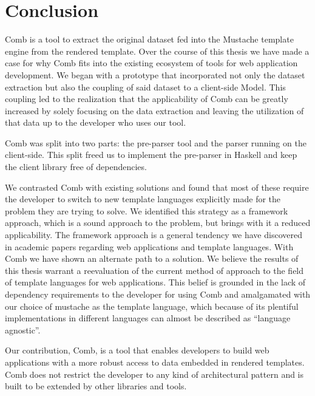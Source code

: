 \documentclass[thesis.tex]{subfiles}
\begin{document}
\chapter{Conclusion}
\label{chap:conclusion}
Comb is a tool to extract the original dataset fed into the Mustache template
engine from the rendered template.
Over the course of this thesis we have made a case for why Comb fits into the
existing ecosystem of tools for web application development.
We began with a prototype that incorporated not only the dataset extraction but
also the coupling of said dataset to a client-side Model.
This coupling led to the realization that the applicability of Comb can be
greatly increased by solely focusing on the data extraction and leaving the
utilization of that data up to the developer who uses our tool.

Comb was split into two parts: the pre-parser tool and the parser running on
the client-side. This split freed us to implement the pre-parser in Haskell
and keep the client library free of dependencies.


We contrasted Comb with existing solutions and found that most of these require
the developer to switch to new template languages explicitly made for the
problem they are trying to solve. We identified this strategy as a framework
approach, which is a sound approach to the problem, but brings with it a reduced
applicability.
The framework approach is a general tendency we have discovered in
academic papers regarding web applications and template languages.
With Comb we have shown an alternate path to a solution.
We believe the results of this thesis warrant a reevaluation of the
current method of approach to the field of template languages for
web applications.
This belief is grounded in the lack of dependency requirements to the developer
for using Comb and amalgamated with our choice of mustache as the template
language, which because of its plentiful implementations in different languages
can almost be described as ``language agnostic''.



Our contribution, Comb, is a tool that enables developers to
build web applications with a more robust access to data embedded in rendered
templates. Comb does not restrict the developer to any kind of architectural
pattern and is built to be extended by other libraries and tools.
\end{document}
